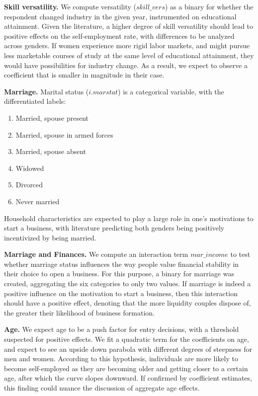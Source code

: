\textbf{Skill versatility.} We compute versatility ($skill\_vers$) as a binary for whether the respondent changed industry in the given year, instrumented on educational attainment. Given the literature, a higher degree of skill versatility should lead to positive effects on the self-employment rate, with differences to be analyzed across genders. If women experience more rigid labor markets, and might pursue less marketable courses of study at the same level of educational attainment, they would have possibilities for industry change. As a result, we expect to observe a coefficient that is smaller in magnitude in their case. 

\textbf{Marriage.}  Marital status ($i.marstat$) is a categorical variable, with the differentiated labels:
\begin{enumerate}
\singlespacing
\item Married, spouse present
\item Married, spouse in armed forces
\item Married, spouse absent
\item Widowed
\item Divorced
\item Never married
\end{enumerate}

Household characteristics are expected to play a large role in one's motivations to start a business, with literature predicting both genders being positively incentivized by being married. 

\textbf{Marriage and Finances.} We compute an interaction term $mar\_income$ to test whether marriage status influences the way people value financial stability in their choice to open a business. For this purpose, a binary for marriage was created, aggregating the six categories to only two values. If marriage is indeed a positive influence on the motivation to start a business, then this interaction should have a positive effect, denoting that the more liquidity couples dispose of, the greater their likelihood of business formation. 

\textbf{Age.} We expect age to be a push factor for entry decisions, with a threshold suspected for positive effects. We fit a quadratic term for the coefficients on age, and expect to see an upside down parabola with different degrees of steepness for men and women. According to this hypothesis, individuals are more likely to become self-employed as they are becoming older and getting closer to a certain age, after which the curve slopes downward. If confirmed by coefficient estimates, this finding could nuance the discussion of aggregate age effects. 

